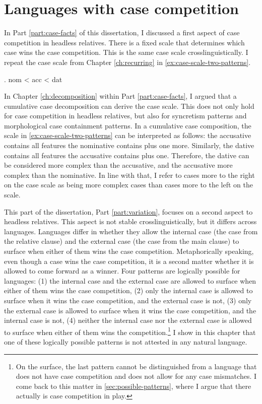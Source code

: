 
\chapter{Languages with case competition}\label{ch:typology}

In Part \ref{part:case-facts} of this dissertation, I discussed a first aspect of case competition in headless relatives. There is a fixed scale that determines which case wins the case competition. This is the same case scale crosslinguistically. I repeat the case scale from Chapter \ref{ch:recurring} in \ref{ex:case-scale-two-patterns}.

\ex. \ac{nom} < \ac{acc} < \ac{dat}\label{ex:case-scale-two-patterns}

In Chapter \ref{ch:decomposition} within Part \ref{part:case-facts}, I argued that a cumulative case decomposition can derive the case scale. This does not only hold for case competition in headless relatives, but also for syncretism patterns and morphological case containment patterns. In a cumulative case composition, the scale in \ref{ex:case-scale-two-patterns} can be interpreted as follows: the accusative contains all features the nominative contains plus one more. Similarly, the dative contains all features the accusative contains plus one. Therefore, the dative can be considered more complex than the accusative, and the accusative more complex than the nominative. In line with that, I refer to cases more to the right on the case scale as being more complex cases than cases more to the left on the scale.

This part of the dissertation, Part \ref{part:variation}, focuses on a second aspect to headless relatives. This aspect is not stable crosslinguistically, but it differs across languages. Languages differ in whether they allow the internal case (the case from the relative clause) and the external case (the case from the main clause) to surface when either of them wins the case competition. Metaphorically speaking, even though a case wins the case competition, it is a second matter whether it is allowed to come forward as a winner. Four patterns are logically possible for languages: (1) the internal case and the external case are allowed to surface when either of them wins the case competition, (2) only the internal case is allowed to surface when it wins the case competition, and the external case is not, (3) only the external case is allowed to surface when it wins the case competition, and the internal case is not, (4) neither the internal case nor the external case is allowed to surface when either of them wins the competition.\footnote{
On the surface, the last pattern cannot be distinguished from a language that does not have case competition and does not allow for any case mismatches. I come back to this matter in \ref{sec:possible-patterns}, where I argue that there actually is case competition in play.
}
I show in this chapter that one of these logically possible patterns is not attested in any natural language.

